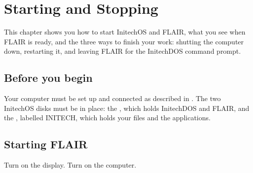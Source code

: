 \chapter{Starting and Stopping}
\label{ch:starting}

This chapter shows you how to start InitechOS and FLAIR, what you see when
FLAIR is ready, and the three ways to finish your work: shutting the
computer down, restarting it, and leaving FLAIR for the InitechDOS command
prompt.

\section{Before you begin}
Your computer must be set up and connected as described in
.  The two InitechOS disks must be in
place: the , which holds InitechDOS and FLAIR, and the
, labelled INITECH, which holds your files and the
applications.

\section{Starting FLAIR}
\begin{TaskSteps}
\Step Turn on the display.
\Step Turn on the computer.
\end{TaskSteps}

